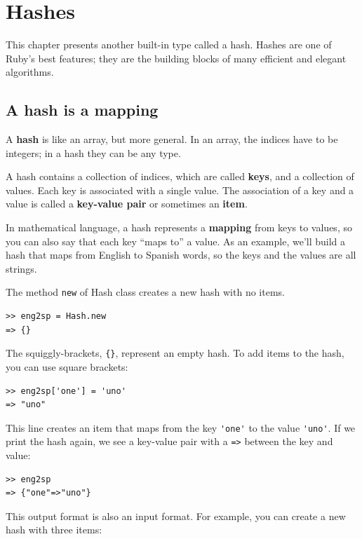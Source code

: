 \documentclass[10pt]{book}
\begin{document}
\chapter{Hashes}

This chapter presents another built-in type called a hash.
Hashes are one of Ruby's best features; they are the
building blocks of many efficient and elegant algorithms.


\section{A hash is a mapping}

A {\bf hash} is like an array, but more general.  In an array,
the indices have to be integers; in a hash they can
be any type.

A hash contains a collection of indices, which are called {\bf
  keys}, and a collection of values.  Each key is associated with a
single value.  The association of a key and a value is called a {\bf
  key-value pair} or sometimes an {\bf item}.

In mathematical language, a hash represents a {\bf mapping}
from keys to values, so you can also say that each key
``maps to'' a value.
As an example, we'll build a hash that maps from English
to Spanish words, so the keys and the values are all strings.

The method {\tt new} of Hash class creates a new hash with no items.

\begin{verbatim}
>> eng2sp = Hash.new
=> {}
\end{verbatim}

The squiggly-brackets, \verb"{}", represent an empty hash.
To add items to the hash, you can use square brackets:

\begin{verbatim}
>> eng2sp['one'] = 'uno'
=> "uno"
\end{verbatim}
%
This line creates an item that maps from the key
\verb"'one'" to the value \verb"'uno'".  If we print the
hash again, we see a key-value pair with a {\tt =>}
between the key and value:

\begin{verbatim}
>> eng2sp
=> {"one"=>"uno"}
\end{verbatim}
%
This output format is also an input format.  For example,
you can create a new hash with three items:
\end{document}
